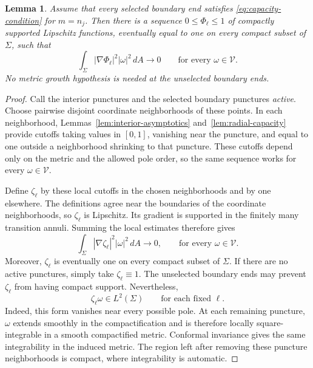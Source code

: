 \documentclass[11pt]{amsart}
\numberwithin{equation}{section}
\newtheorem{lemma}[theorem]{Lemma}
\theoremstyle{definition}
\theoremstyle{remark}
\begin{document}
\begin{lemma}\label{lem:mixed-cutoffs}
Assume that every selected boundary end satisfies \eqref{eq:capacity-condition} for $m=n_j$. Then there is a sequence $0\le\Phi_\ell\le1$ of compactly supported Lipschitz functions, eventually equal to one on every compact subset of $\Sigma$, such that
\begin{equation}\label{eq:mixed-error}
\int_\Sigma|\nabla\Phi_\ell|^2|\omega|^2\,dA\longrightarrow0
\qquad\text{for every }\omega\in\mathcal V.
\end{equation}
No metric growth hypothesis is needed at the unselected boundary ends.
\end{lemma}
\begin{proof}
Call the interior punctures and the selected boundary punctures
\emph{active}. Choose pairwise disjoint coordinate neighborhoods of
these points. In each neighborhood, Lemmas~\ref{lem:interior-asymptotics}
and~\ref{lem:radial-capacity} provide cutoffs taking values in $[0,1]$,
vanishing near the puncture, and equal to one outside a neighborhood
shrinking to that puncture. These cutoffs depend only on the metric and
the allowed pole order, so the same sequence works for every
$\omega\in\mathcal V$.

Define $\zeta_\ell$ by these local cutoffs in the chosen neighborhoods
and by one elsewhere. The definitions agree near the boundaries
of the coordinate neighborhoods, so $\zeta_\ell$ is Lipschitz.
Its gradient is supported in the finitely many transition annuli.
Summing the local estimates therefore gives
\[
\int_\Sigma|\nabla\zeta_\ell|^2|\omega|^2\,dA
\longrightarrow0,
\qquad\text{for every }\omega\in\mathcal V.
\]
Moreover, $\zeta_\ell$ is eventually one on every compact subset
of $\Sigma$. If there are no active punctures, simply take
$\zeta_\ell\equiv1$.
The unselected boundary ends may prevent $\zeta_\ell$ from having
compact support. Nevertheless,
\[
\zeta_\ell\omega\in L^2(\Sigma)
\qquad\text{for each fixed }\ell.
\]
Indeed, this form vanishes near every possible pole. At each
remaining puncture, $\omega$ extends smoothly in the compactification
and is therefore locally square-integrable in a smooth compactified
metric. Conformal invariance gives the same integrability in the
induced metric. The region left after removing these puncture
neighborhoods is compact, where integrability is automatic.


\end{proof}
\end{document}

